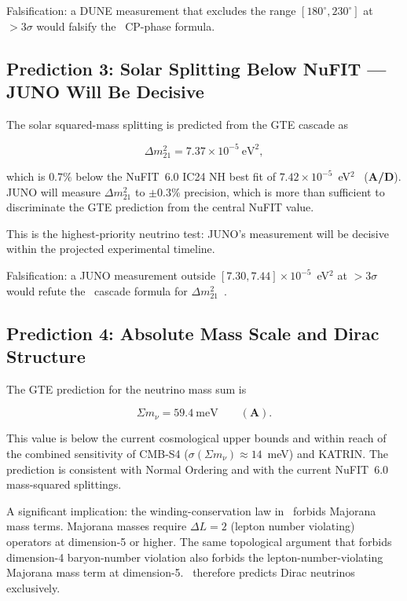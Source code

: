 \documentclass[11pt,openany]{book}
\theoremstyle{remark}
\newcommand{\GTE}{\text{GTE}}
\newcommand{\CatA}{\textbf{A}}
\newcommand{\CatAD}{\textbf{A/D}}
\begin{document}
Falsification: a DUNE measurement that excludes the range $[180^\circ, 230^\circ]$
at $>3\sigma$ would falsify the \GTE\ CP-phase formula.

\subsection*{Prediction 3: Solar Splitting Below NuFIT --- JUNO Will Be Decisive}

The solar squared-mass splitting is predicted from the GTE cascade as

\begin{equation}
\Delta m^2_{21} = 7.37 \times 10^{-5}~\text{eV}^2,
\end{equation}

which is $0.7\%$ below the NuFIT~6.0 IC24 NH best fit of
$7.42 \times 10^{-5}$~eV$^2$~\cite{NuFIT60} (\CatAD).  JUNO will
measure $\Delta m^2_{21}$ to $\pm 0.3\%$ precision, which is more than sufficient
to discriminate the GTE prediction from the central NuFIT value.

This is the highest-priority neutrino test: JUNO's measurement will be decisive
within the projected experimental timeline.

Falsification: a JUNO measurement outside $[7.30, 7.44] \times 10^{-5}$~eV$^2$ at
$>3\sigma$ would refute the \GTE\ cascade formula for $\Delta m^2_{21}$~\cite{JUNO}.

\subsection*{Prediction 4: Absolute Mass Scale and Dirac Structure}

The GTE prediction for the neutrino mass sum is

\begin{equation}
\Sigma m_\nu = 59.4~\text{meV} \qquad (\CatA).
\end{equation}

This value is below the current cosmological upper bounds and within reach of the
combined sensitivity of CMB-S4 ($\sigma(\Sigma m_\nu) \approx 14$~meV) and KATRIN.
The prediction is consistent with Normal Ordering and with the current NuFIT~6.0
mass-squared splittings.

A significant implication: the winding-conservation law in \GTE\ forbids Majorana
mass terms.  Majorana masses require $\Delta L = 2$ (lepton number violating) operators
at dimension-5 or higher.  The same topological argument that forbids dimension-4
baryon-number violation also forbids the lepton-number-violating Majorana mass term
at dimension-5.  \GTE\ therefore predicts Dirac neutrinos exclusively.
\end{document}
